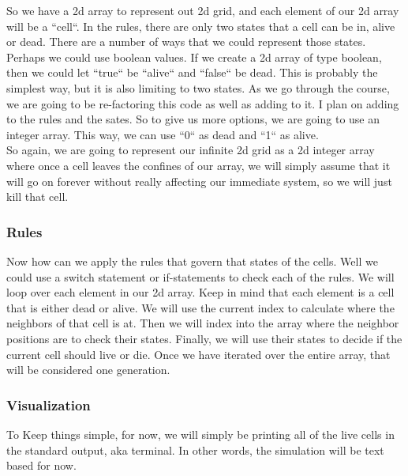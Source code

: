 \documentclass[11]{article}
\begin{document}
So we have a 2d array to represent out 2d grid, and each element of our 2d array will be a ``cell``. In the rules, there are only two states that a cell can be in, alive or dead. There are a number of ways that we could represent those states. Perhaps we could use boolean values. If we create a 2d array of type boolean, then we could let ``true`` be ``alive`` and ``false`` be dead. This is probably the simplest way, but it is also limiting to two states. As we go through the course, we are going to be re-factoring this code as well as adding to it. I plan on adding to the rules and the sates. So to give us more options, we are going to use an integer array. This way, we can use ``0`` as dead and ``1`` as alive.\\

So again, we are going to represent our infinite 2d grid as a 2d integer array where once a cell leaves the confines of our array, we will simply assume that it will go on forever without really affecting our immediate system, so we will just kill that cell.

\subsubsection{Rules}
Now how can we apply the rules that govern that states of the cells. Well we could use a switch statement or if-statements to check each of the rules. We will loop over each element in our 2d array. Keep in mind that each element is a cell that is either dead or alive. We will use the current index to calculate where the neighbors of that cell is at. Then we will index into the array where the neighbor positions are to check their states. Finally, we will use their states to decide if the current cell should live or die. Once we have iterated over the entire array, that will be considered one generation.

\subsubsection{Visualization}
To Keep things simple, for now, we will simply be printing all of the live cells in the standard output, aka terminal. In other words, the simulation will be text based for now.
\end{document}
